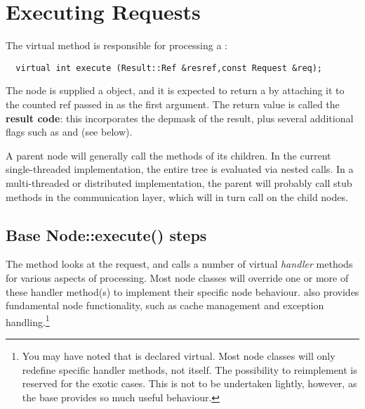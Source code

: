 \chapter{Executing Requests}
  \label{chap:execute}

  The virtual  method is responsible for processing a
  \Request:
  
  \begin{verbatim}
  virtual int execute (Result::Ref &resref,const Request &req);
  \end{verbatim}
  
  \noindent The node is supplied a  object, and it is expected to return a
   by attaching it to the counted ref passed in as the first
  argument. The return value is called the {\bf result code}: this
  incorporates the depmask of the result, plus several additional flags such
  as  and  (see below).

  A parent node will generally call the  methods of its
  children. In the current single-threaded implementation, the entire tree
  is evaluated via nested  calls. In a multi-threaded or
  distributed implementation, the parent will probably call stub methods in
  the communication layer, which will in turn call  on the
  child nodes.


  
\section{Base Node::execute() steps}
   \label{sec:execute}
  
  
  The  method looks at the request, and calls a number
  of virtual {\em handler} methods for various aspects of processing. Most
  node classes will override one or more of these handler method(s) to
  implement their specific node behaviour.  also
  provides fundamental node functionality, such as cache management and
  exception handling.\footnote{You may have noted that  is
  declared virtual. Most node classes will only redefine specific handler
  methods, not  itself.  The possibility to reimplement
   is reserved for the exotic cases. This is not to be
  undertaken lightly, however, as the base  provides so
  much useful behaviour.}

